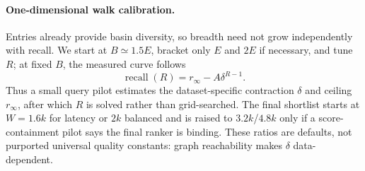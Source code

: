 \documentclass{article}
\begin{document}
\paragraph{One-dimensional walk calibration.} Entries already provide basin
diversity, so breadth need not grow independently with recall.  We start at
$B\simeq1.5E$, bracket only $E$ and $2E$ if necessary, and tune $R$; at fixed
$B$, the measured curve follows
\[
 \operatorname{recall}(R)=r_\infty-A\delta^{R-1}.
\]
Thus a small query pilot estimates the dataset-specific contraction $\delta$
and ceiling $r_\infty$, after which $R$ is solved rather than grid-searched.
The final shortlist starts at $W=1.6k$ for latency or $2k$ balanced and is raised
to $3.2k$/$4.8k$ only if a score-containment pilot says the final ranker is
binding.  These ratios are defaults, not purported universal quality constants:
graph reachability makes $\delta$ data-dependent.
\end{document}
